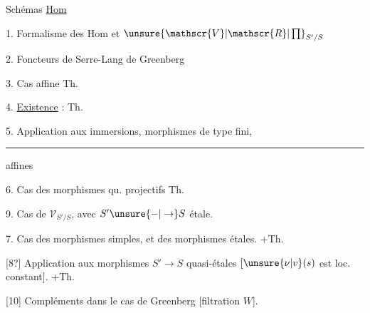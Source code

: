 

Schémas \uline{Hom}  

1. Formalisme des $\mathrm{Hom}$ et $\unsure{\mathscr{V}|\mathscr{R}|\prod}_{S'/S}$

2.   Foncteurs de Serre-Lang  de Greenberg

3.  Cas affine \hfill Th.

4. \uline{Existence}  :  \hfill Th.

5. Application aux immersions, morphismes de type fini, \hfill \rule{1.5cm}{0.35pt} affines

6. Cas des morphismes qu. projectifs \hfill Th.


9.  Cas de $\mathscr{V}_{S'/S}$, avec $S'\unsure{-|\to}S$ étale.


7. Cas des morphismes simples, et des morphismes étales. \hfill +Th.

[8?] Application aux morphismes $S'\to S$ quasi-étales $[\unsure{\nu|v}(s)$ est loc. constant$]$. \hfill +Th.

[10] Compléments dans le cas de Greenberg [filtration  $W$].


